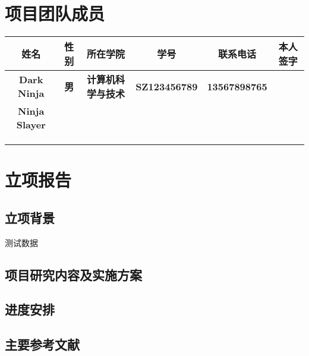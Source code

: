 \documentclass{project_env}
\begin{document}
\section{ 项目团队成员 }
\begin{table}[h]
	\centering
	\begin{adjustbox}{width=1\textwidth}
		\begin{tabular}{|c|c|c|c|c|c|}
			\hline
			\textbf{姓名}         & \textbf{性别} & \textbf{所在学院}         & \textbf{学号}        & \textbf{联系电话}    & \textbf{本人签字} \\ \hline
			\textbf{Dark Ninja}   & \textbf{男}   & \textbf{计算机科学与技术} & \textbf{SZ123456789} & \textbf{13567898765} & \textbf{}         \\ \hline
			\textbf{Ninja Slayer} & \textbf{}     & \textbf{}                 & \textbf{}            & \textbf{}            & \textbf{}         \\ \hline
			\textbf{}             & \textbf{}     & \textbf{}                 & \textbf{}            & \textbf{}            & \textbf{}         \\ \hline
			\textbf{}             & \textbf{}     & \textbf{}                 & \textbf{}            & \textbf{}            & \textbf{}         \\ \hline
			\textbf{}             & \textbf{}     & \textbf{}                 & \textbf{}            & \textbf{}            & \textbf{}         \\ \hline
		\end{tabular}
	\end{adjustbox}
\end{table}

\section{ 立项报告 }
\begin{mdframed}{%
		\subsection{ 立项背景 } %
		\par 测试数据 \cite{_bp_2018}
		\subsection{ 项目研究内容及实施方案 }
		\subsection{ 进度安排 }
		\subsection{ 主要参考文献 } %
		\printbibliography
		\vfil
	}
\end{mdframed}
\end{document}

